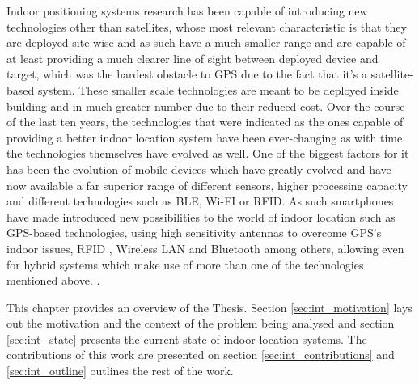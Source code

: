 Indoor positioning systems research has been capable of introducing new technologies other than satellites, whose most relevant characteristic is that they are deployed site-wise and as such have a much smaller range and are capable of at least providing a much clearer line of sight between deployed device and target, which was the hardest obstacle to \ac{GPS} due to the fact that it's a satellite-based system. These smaller scale technologies are meant to be deployed inside building and in much greater number due to their reduced cost. Over the course of the last ten years, the technologies that  were indicated as the ones capable of providing a better indoor location system have been ever-changing as with time the technologies themselves have evolved as well. One of the biggest factors for it has been the evolution of mobile devices which have greatly evolved and have now available a far superior range of different sensors, higher processing capacity and different technologies such as \ac{BLE}, Wi-FI or \ac{RFID}. As such smartphones have made introduced new possibilities to the world of indoor location such as GPS-based technologies, using high sensitivity antennas to overcome GPS's indoor issues, \ac{RFID} , Wireless \ac{LAN} and Bluetooth among others, allowing even for hybrid systems which make use of more than one of the technologies mentioned above. \cite{surveywireless,survey2,survey1}.

This chapter provides an overview of the Thesis. Section \ref{sec:int_motivation} lays out the motivation and the context of the problem being analysed and section \ref{sec:int_state} presents the current state of indoor location systems. The contributions of this work are presented on section \ref{sec:int_contributions} and \ref{sec:int_outline} outlines the rest of the work.






\cleardoublepage